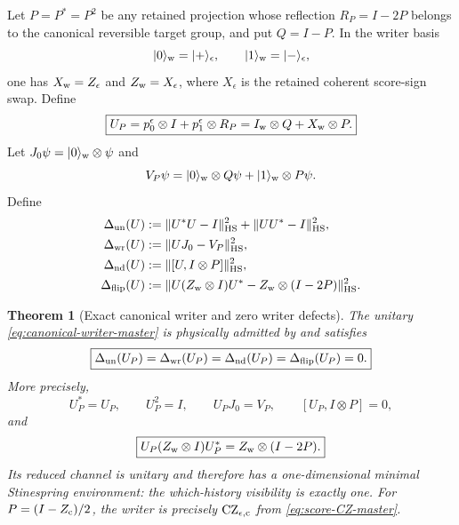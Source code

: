 \documentclass[11pt]{article}
\newtheorem{theorem}{Theorem}[section]
\theoremstyle{definition}
\theoremstyle{remark}
\newcommand{\norm}[1]{\lVert#1\rVert}
\begin{document}
Let $P=P^*=P^2$ be any retained projection whose reflection
$R_P=I-2P$ belongs to the canonical reversible target group, and put
$Q=I-P$.  In the writer basis
\[
 |0\rangle_{\rm w}=|+\rangle_{\epsilon},
 \qquad
 |1\rangle_{\rm w}=|-\rangle_{\epsilon},
\]
one has $X_{\rm w}=Z_{\epsilon}$ and
$Z_{\rm w}=X_{\epsilon}$, where $X_{\epsilon}$ is the retained coherent
score-sign swap.  Define
\begin{equation}
 \boxed{
 U_P
 =p_0^{\epsilon}\otimes I+p_1^{\epsilon}\otimes R_P
 =I_{\rm w}\otimes Q+X_{\rm w}\otimes P.}
 \label{eq:canonical-writer-master}
\end{equation}
Let $J_0\psi=|0\rangle_{\rm w}\otimes\psi$ and
\[
 V_P\psi
 =|0\rangle_{\rm w}\otimes Q\psi
  +|1\rangle_{\rm w}\otimes P\psi.
\]
Define
\begin{align}
 \Delta_{\rm un}(U)
 &:=\norm{U^*U-I}_{\rm HS}^2+\norm{UU^*-I}_{\rm HS}^2,
 \label{eq:writer-unitary-defect-master}\\
 \Delta_{\rm wr}(U)
 &:=\norm{UJ_0-V_P}_{\rm HS}^2,
 \label{eq:writer-law-defect-master}\\
 \Delta_{\rm nd}(U)
 &:=\norm{[U,I\otimes P]}_{\rm HS}^2,
 \label{eq:writer-ND-defect-master}\\
 \Delta_{\rm flip}(U)
 &:=\norm{
 U(Z_{\rm w}\otimes I)U^*
 -Z_{\rm w}\otimes(I-2P)}_{\rm HS}^2.
 \label{eq:writer-flip-defect-master}
\end{align}

\begin{theorem}[Exact canonical writer and zero writer defects]
\label{thm:canonical-writer-defects-master}
The unitary \eqref{eq:canonical-writer-master} is physically admitted by
 and satisfies
\begin{equation}
 \boxed{
 \Delta_{\rm un}(U_P)
 =\Delta_{\rm wr}(U_P)
 =\Delta_{\rm nd}(U_P)
 =\Delta_{\rm flip}(U_P)=0.}
 \label{eq:writer-defects-zero-master}
\end{equation}
More precisely,
\[
 U_P^*=U_P,\qquad U_P^2=I,\qquad U_PJ_0=V_P,
 \qquad [U_P,I\otimes P]=0,
\]
and
\begin{equation}
 \boxed{
 U_P(Z_{\rm w}\otimes I)U_P^*
 =Z_{\rm w}\otimes(I-2P).}
 \label{eq:writer-phase-kickback-master}
\end{equation}
Its reduced channel is unitary and therefore has a one-dimensional minimal
Stinespring environment: the which-history visibility is exactly one.  For
$P=(I-Z_{\rm c})/2$, the writer is precisely
$\operatorname{CZ}_{\epsilon,{\rm c}}$ from
\eqref{eq:score-CZ-master}.
\end{theorem}
\end{document}
